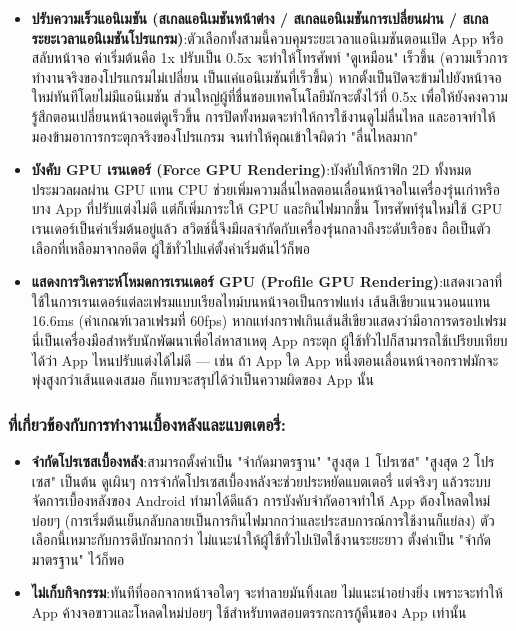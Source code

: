 \begin{itemize}
  \item \textbf{ปรับความเร็วแอนิเมชัน (สเกลแอนิเมชันหน้าต่าง / สเกลแอนิเมชันการเปลี่ยนผ่าน / สเกลระยะเวลาแอนิเมชันโปรแกรม)}:ตัวเลือกทั้งสามนี้ควบคุมระยะเวลาแอนิเมชันตอนเปิด App หรือสลับหน้าจอ ค่าเริ่มต้นคือ 1x ปรับเป็น 0.5x จะทำให้โทรศัพท์ "ดูเหมือน" เร็วขึ้น (ความเร็วการทำงานจริงของโปรแกรมไม่เปลี่ยน เป็นแค่แอนิเมชันที่เร็วขึ้น) หากตั้งเป็นปิดจะข้ามไปยังหน้าจอใหม่ทันทีโดยไม่มีแอนิเมชัน ส่วนใหญ่ผู้ที่ชื่นชอบเทคโนโลยีมักจะตั้งไว้ที่ 0.5x เพื่อให้ยังคงความรู้สึกตอนเปลี่ยนหน้าจอแต่ดูเร็วขึ้น การปิดทั้งหมดจะทำให้การใช้งานดูไม่ลื่นไหล และอาจทำให้มองข้ามอาการกระตุกจริงของโปรแกรม จนทำให้คุณเข้าใจผิดว่า "ลื่นไหลมาก"
  \item \textbf{บังคับ GPU เรนเดอร์ (Force GPU Rendering)}:บังคับให้กราฟิก 2D ทั้งหมดประมวลผลผ่าน GPU แทน CPU ช่วยเพิ่มความลื่นไหลตอนเลื่อนหน้าจอในเครื่องรุ่นเก่าหรือบาง App ที่ปรับแต่งไม่ดี แต่ก็เพิ่มภาระให้ GPU และกินไฟมากขึ้น โทรศัพท์รุ่นใหม่ใช้ GPU เรนเดอร์เป็นค่าเริ่มต้นอยู่แล้ว สวิตช์นี้จึงมีผลจำกัดกับเครื่องรุ่นกลางถึงระดับเรือธง ถือเป็นตัวเลือกที่เหลือมาจากอดีต ผู้ใช้ทั่วไปแค่ตั้งค่าเริ่มต้นไว้ก็พอ
  \item \textbf{แสดงการวิเคราะห์โหมดการเรนเดอร์ GPU (Profile GPU Rendering)}:แสดงเวลาที่ใช้ในการเรนเดอร์แต่ละเฟรมแบบเรียลไทม์บนหน้าจอเป็นกราฟแท่ง เส้นสีเขียวแนวนอนแทน 16.6ms (ค่าเกณฑ์เวลาเฟรมที่ 60fps) หากแท่งกราฟเกินเส้นสีเขียวแสดงว่ามีอาการดรอปเฟรม นี่เป็นเครื่องมือสำหรับนักพัฒนาเพื่อไล่หาสาเหตุ App กระตุก ผู้ใช้ทั่วไปก็สามารถใช้เปรียบเทียบได้ว่า App ไหนปรับแต่งได้ไม่ดี — เช่น ถ้า App ใด App หนึ่งตอนเลื่อนหน้าจอกราฟมักจะพุ่งสูงกว่าเส้นแดงเสมอ ก็แทบจะสรุปได้ว่าเป็นความผิดของ App นั้น
\end{itemize}

\subsubsection*{ที่เกี่ยวข้องกับการทำงานเบื้องหลังและแบตเตอรี่:}

\begin{itemize}
  \item \textbf{จำกัดโปรเซสเบื้องหลัง}:สามารถตั้งค่าเป็น "จำกัดมาตรฐาน" "สูงสุด 1 โปรเซส" "สูงสุด 2 โปรเซส" เป็นต้น ดูเผินๆ การจำกัดโปรเซสเบื้องหลังจะช่วยประหยัดแบตเตอรี่ แต่จริงๆ แล้วระบบจัดการเบื้องหลังของ Android ทำมาได้ดีแล้ว การบังคับจำกัดอาจทำให้ App ต้องโหลดใหม่บ่อยๆ (การเริ่มต้นเย็นกลับกลายเป็นการกินไฟมากกว่าและประสบการณ์การใช้งานก็แย่ลง) ตัวเลือกนี้เหมาะกับการดีบักมากกว่า ไม่แนะนำให้ผู้ใช้ทั่วไปเปิดใช้งานระยะยาว ตั้งค่าเป็น "จำกัดมาตรฐาน" ไว้ก็พอ
  \item \textbf{ไม่เก็บกิจกรรม}:ทันทีที่ออกจากหน้าจอใดๆ จะทำลายมันทิ้งเลย ไม่แนะนำอย่างยิ่ง เพราะจะทำให้ App ค้างจอขาวและโหลดใหม่บ่อยๆ ใช้สำหรับทดสอบตรรกะการกู้คืนของ App เท่านั้น
\end{itemize}

